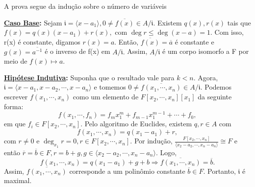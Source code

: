 \documentclass[AlgebraII/algebraII_notes.tex]{subfiles}
\begin{document}
\begin{proof*}

	A prova segue da indução sobre o número de variáveis

	\textbf{\underline{Caso Base}:} Sejam \(\mathfrak{i} = \langle x - a_{1} \rangle, 0\neq \overline{f(x)}\in A/\mathfrak{i}.\)
	Existem \(q(x), r(x)\) tais que \(f(x) = q(x)(x-a_{1})+r(x),\) com \(\deg{r}\leq \deg{(x-a)}=1.\) Com isso,
	r(x) é constante, digamos \(r(x) = a\). Então, \(\overline{f(x)}=\overline{a}\) é constante e
	\(g(x) = \overline{a^{-1}}\) é o inverso de f(x) em \(A/\mathfrak{i}.\) Assim, \(A/\mathfrak{i}\) é um corpo isomorfo a F por meio
	de \(f(x)\mapsto a.\)

	\textbf{\underline{Hipótese Indutiva}:} Suponha que o resultado vale para \(k < n\). Agora, \(\mathfrak{i} = \langle x-a_{1}, x-a_{2}, \cdots, x-a_{n} \rangle\) e tomemos
	\(0\neq \overline{f(x_{1}, \cdots, x_{n})}\in A/\mathfrak{i}\). Podemos escrever
	\(f(x_{1}, \cdots, x_{n})\) como um elemento de \(F[x_{2}, \cdots, x_{n}][x_{1}]\) da seguinte forma:
	\[
		f(x_{1}, \cdots, f_{n}) = f_{m}x_{1}^{m} + f_{m-1}x_{1}^{m-1} + \cdots + f_{0},
	\]
	em que \(f_{i}\in F[x_{2}, \cdots, x_{n}].\) Pelo algoritmo de Euclides, existem \(q, r\in A\) com
	\[
		f(x_{1}, \cdots, x_{n}) = q(x_{1} - a_{1} ) + r,
	\]
	com \(r\neq0\) e \(\deg_{x_{1}}{r} = 0, r \in F[x_{2}, \cdots, x_{n}].\) Por indução, \(\frac{F[x_{2}, \cdots, x_{n}]}{\langle x_{2}-a_{2}, \cdots, x_{n}-a_{n} \rangle}\cong{F}\) e
	então \(\overline{r} = \overline{b}\in F, r = b+g, g\in \langle x_{2}-a_{2}, \cdots, x_{n}-a_{n} \rangle\). Logo,
	\[
		f(x_{1}, \cdots, x_{n}) = q(x_{1}-a_{1}) + g + b \Rightarrow \overline{f(x_{1}, \cdots, x_{n})} = \overline{b}.
	\]
	Assim, \(\overline{f(x_{1}, \cdots, x_{n})}\) corresponde a um polinômio constante \(\overline{b}\in F.\)
	Portanto, \(\mathfrak{i}\) é maximal. \qedsymbol
\end{proof*}
\end{document}
